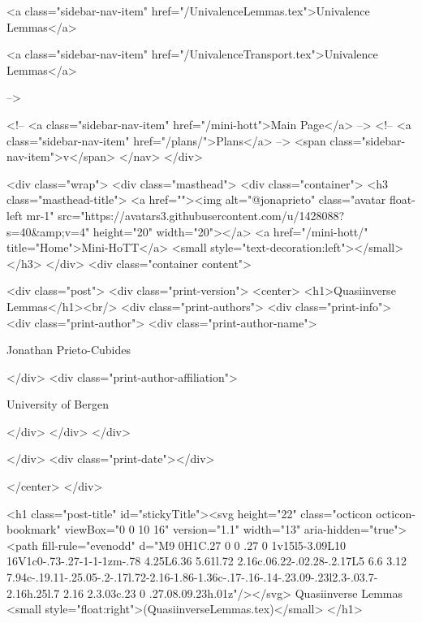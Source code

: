       
    
      
        
          <a class="sidebar-nav-item" href="/UnivalenceLemmas.tex">Univalence Lemmas</a>
        
      
    
      
        
          <a class="sidebar-nav-item" href="/UnivalenceTransport.tex">Univalence Lemmas</a>
        
      
     -->

    <!-- <a class="sidebar-nav-item" href="/mini-hott">Main Page</a> -->
    <!-- <a class="sidebar-nav-item" href="/plans/">Plans</a> -->
    <span class="sidebar-nav-item">v</span>
  </nav>
</div>

    <div class="wrap">
      <div class="masthead">
        <div class="container">
          <h3 class="masthead-title">
            <a href=""><img alt="@jonaprieto" class="avatar float-left mr-1" src="https://avatars3.githubusercontent.com/u/1428088?s=40&amp;v=4" height="20" width="20"></a>
            <a href="/mini-hott/" title="Home">Mini-HoTT</a>
            <small style="text-decoration:left"></small>
          </h3>
        </div>
      <div class="container content">
        







<div class="post">
  <div class="print-version">
    <center>
      <h1>Quasiinverse Lemmas</h1><br/>
        <div class="print-authors">
          <div class="print-info">
            <div class="print-author">
              <div class="print-author-name">
                
                  Jonathan Prieto-Cubides
                
              </div>
              <div class="print-author-affiliation">
                
                  University of Bergen
                
                </div>
            </div>
          </div>
          
          
        </div>
        <div class="print-date"></div>
        
        
    </center>
  </div>

  

  <h1 class="post-title" id="stickyTitle"><svg height="22" class="octicon octicon-bookmark" viewBox="0 0 10 16" version="1.1" width="13" aria-hidden="true"><path fill-rule="evenodd" d="M9 0H1C.27 0 0 .27 0 1v15l5-3.09L10 16V1c0-.73-.27-1-1-1zm-.78 4.25L6.36 5.61l.72 2.16c.06.22-.02.28-.2.17L5 6.6 3.12 7.94c-.19.11-.25.05-.2-.17l.72-2.16-1.86-1.36c-.17-.16-.14-.23.09-.23l2.3-.03.7-2.16h.25l.7 2.16 2.3.03c.23 0 .27.08.09.23h.01z"/></svg> Quasiinverse Lemmas <small style="float:right">(QuasiinverseLemmas.tex)</small>
  </h1>

